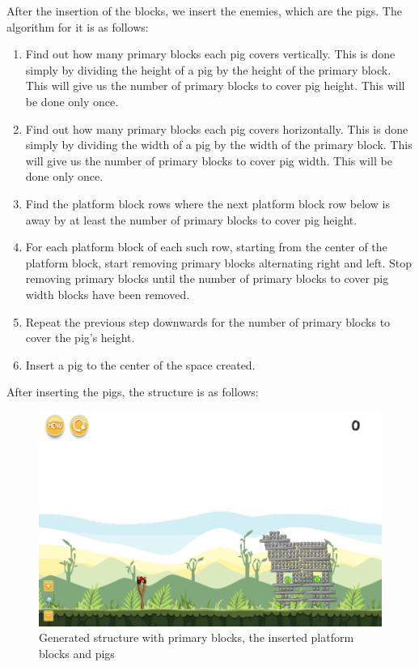 \documentclass{dalthesis}
\begin{document}
After the insertion of the blocks, we insert the enemies, which are the pigs. The algorithm for it is as follows:

\begin{enumerate}
  \item Find out how many primary blocks each pig covers vertically. This is done simply by dividing the height of a pig by the height of the primary block. This will give us the number of primary blocks to cover pig height. This will be done only once.

  \item Find out how many primary blocks each pig covers horizontally. This is done simply by dividing the width of a pig by the width of the primary block. This will give us the number of primary blocks to cover pig width. This will be done only once.

  \item Find the platform block rows where the next platform block row below is away by at least the number of primary blocks to cover pig height.

  \item For each platform block of each such row, starting from the center of the platform block, start removing primary blocks alternating right and left. Stop removing primary blocks until the number of primary blocks to cover pig width blocks have been removed.

  \item Repeat the previous step downwards for the number of primary blocks to cover the pig's height.

  \item Insert a pig to the center of the space created.
\end{enumerate}

After inserting the pigs, the structure is as follows:

\begin{figure}[H]
	\caption{Generated structure with primary blocks, the inserted platform blocks and pigs}
  \includegraphics[width=\textwidth,height=\textheight,keepaspectratio]{process/cow-complete.png}
\end{figure}
\end{document}
